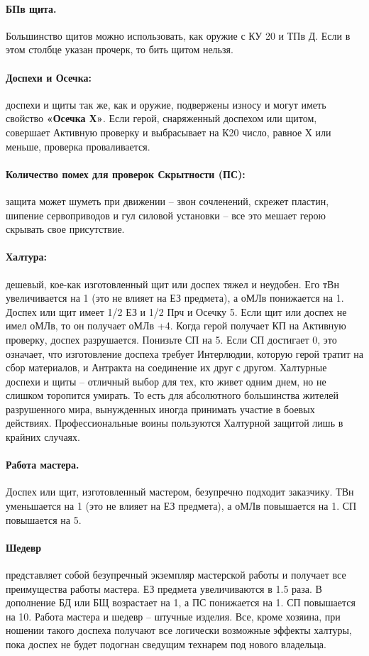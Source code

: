 \paragraph{БПв щита.} Большинство щитов можно использовать, как оружие с КУ 20 и ТПв Д. Если в этом столбце указан прочерк, то бить щитом нельзя.
\paragraph{Доспехи и Осечка:} доспехи и щиты так же, как и оружие, подвержены износу и могут иметь свойство \textbf{«Осечка Х»}. Если герой, снаряженный доспехом или щитом, совершает Активную проверку и выбрасывает на К20 число, равное Х или меньше, проверка проваливается. 
\paragraph{Количество помех для проверок Скрытности (ПС):} защита может шуметь при движении – звон сочленений, скрежет пластин, шипение сервоприводов и гул силовой установки – все это мешает герою  скрывать свое присутствие.

\paragraph{Халтура:} дешевый, кое-как изготовленный щит или доспех тяжел и неудобен. Его тВн увеличивается на 1 (это не влияет на ЕЗ предмета), а оМЛв понижается на 1. Доспех или щит имеет 1/2 ЕЗ и 1/2 Прч и Осечку 5. Если щит или доспех не имел оМЛв, то он получает оМЛв +4. Когда герой получает КП на Активную проверку, доспех разрушается. Понизьте СП на 5. Если СП достигает 0, это означает, что изготовление доспеха требует Интерлюдии, которую герой тратит на сбор материалов, и Антракта на соединение их друг с другом.
\newline Халтурные доспехи и щиты – отличный выбор для тех, кто живет одним днем, но не слишком торопится умирать. То есть для абсолютного большинства жителей разрушенного мира, вынужденных иногда принимать участие в боевых действиях. Профессиональные воины пользуются Халтурной защитой лишь в крайних случаях.
\paragraph{Работа мастера.} Доспех или щит, изготовленный мастером, безупречно подходит заказчику. ТВн уменьшается на 1 (это не влияет на ЕЗ предмета), а оМЛв повышается на 1. СП повышается на 5.
\paragraph{Шедевр} представляет собой безупречный экземпляр мастерской работы и получает все преимущества работы мастера. ЕЗ предмета увеличиваются в 1.5 раза. В дополнение БД или БЩ возрастает на 1, а ПС понижается на 1. СП повышается на 10.
\newline Работа мастера и шедевр – штучные изделия. Все, кроме хозяина, при ношении такого доспеха получают все логически возможные эффекты халтуры, пока доспех не будет подогнан сведущим технарем под нового владельца.
